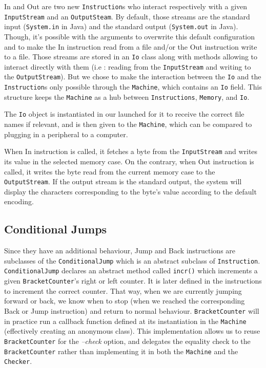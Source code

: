\documentclass{article}
\begin{document}
In and Out are two new \texttt{Instruction}s who interact respectively with a given \texttt{InputStream} and an \texttt{OutputSteam}. By default, those streams are the standard input (\texttt{System.in} in Java) and the standard output (\texttt{System.out} in Java). Though, it's possible with the arguments to overwrite this default configuration and to make the In instruction read from a file and/or the Out instruction write to a file. Those streams are stored in an \texttt{Io} class along with methods allowing to interact directly with them (i.e : reading from the \texttt{InputStream} and writing to the \texttt{OutputStream}). But we chose to make the interaction between the \texttt{Io} and the \texttt{Instruction}s only possible through the \texttt{Machine}, which contains an \texttt{Io} field. This structure keeps the \texttt{Machine} as a hub between \texttt{Instructions}, \texttt{Memory}, and \texttt{Io}.

The \texttt{Io} object is instantiated in our launched for it to receive the correct file names if relevant, and is then given to the \texttt{Machine}, which can be compared to plugging in a peripheral to a computer.

When In instruction is called, it fetches a byte from the \texttt{InputStream} and writes its value in the selected memory case. On the contrary, when Out instruction is called, it writes the byte read from the current memory case to the \texttt{OutputStream}. If the output stream is the standard output, the system will display the characters corresponding to the byte's value according to the default encoding.

\subsection{Conditional Jumps}

Since they have an additional behaviour, Jump and Back instructions are subclasses of the \texttt{ConditionalJump} which is an abstract subclass of \texttt{Instruction}. \texttt{ConditionalJump} declares an abstract method called \texttt{incr()} which increments a given \texttt{BracketCounter}'s right or left counter. It is later defined in the instructions to increment the correct counter. That way, when we are currently jumping forward or back, we know when to stop (when we reached the corresponding Back or Jump instruction) and return to normal behaviour. \texttt{BracketCounter} will in practice run a callback function defined at its instantiation in the \texttt{Machine} (effectively creating an anonymous class). This implementation allows us to reuse \texttt{BracketCounter} for the \textit{--check} option, and delegates the equality check to the \texttt{BracketCounter} rather than implementing it in both the \texttt{Machine} and the \texttt{Checker}.
\end{document}
